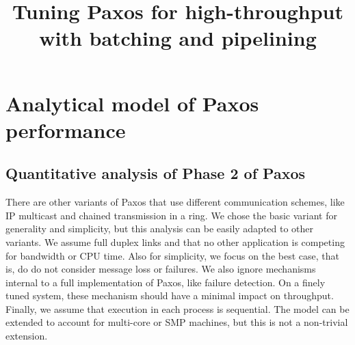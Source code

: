 \documentclass[10pt,preprint]{sigplanconf}
\date{}
\begin{document}
\title{Tuning Paxos for high-throughput with batching and pipelining} 
\maketitle

\section{Analytical model of Paxos performance}
\subsection{Quantitative analysis of Phase 2 of Paxos}
There are other variants of Paxos that use different communication schemes, like IP multicast and chained transmission in a ring. We chose the basic variant for generality and simplicity, but this analysis can be easily adapted to other variants. We assume full duplex links and that no other application is competing for bandwidth or CPU time. Also for simplicity, we focus on the best case, that is, do do not consider message loss or failures. We also ignore mechanisms internal to a full implementation of Paxos, like failure detection. On a finely tuned system, these mechanism should have a minimal impact on throughput. Finally, we assume that execution in each process is sequential. The model can be extended to account for multi-core or SMP machines, but this is not a non-trivial extension.
\end{document}
